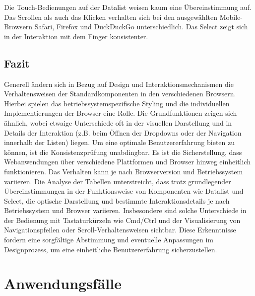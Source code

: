 Die Touch-Bedienungen auf der Datalist weisen kaum eine Übereinstimmung auf. 
Das Scrollen als auch das Klicken verhalten sich bei den ausgewählten Mobile-Browsern Safari, Firefox und DuckDuckGo unterschiedlich.
Das Select zeigt sich in der Interaktion mit dem Finger konsistenter. 


\clearpage
\subsection{Fazit}
\label{sec:summeryExisting}

Generell ändern sich in Bezug auf Design und Interaktionsmechanismen die Verhaltensweisen der Standardkomponenten in den verschiedenen Browsern. 
Hierbei spielen das betriebssystemspezifische Styling und die individuellen Implementierungen der Browser eine Rolle. 
Die Grundfunktionen zeigen sich ähnlich, wobei etwaige Unterschiede oft in der visuellen Darstellung und in Details der Interaktion (z.B. beim Öffnen der Dropdowns oder der Navigation innerhalb der Listen) liegen. 
Um eine optimale Benutzererfahrung bieten zu können, ist die Konsistenzprüfung unabdingbar.
Es ist die Sicherstellung, dass Webanwendungen über verschiedene Plattformen und Browser hinweg einheitlich funktionieren. 
Das Verhalten kann je nach Browserversion und Betriebssystem variieren. 
Die Analyse der Tabellen unterstreicht, dass trotz grundlegender Übereinstimmungen in der Funktionsweise von Komponenten wie Datalist und Select, 
die optische Darstellung und bestimmte Interaktionsdetails je nach Betriebssystem und Browser variieren. 
Insbesondere sind solche Unterschiede in der Bedienung mit Tastaturkürzeln wie Cmd/Ctrl und der Visualisierung von Navigationspfeilen oder Scroll-Verhaltensweisen sichtbar. 
Diese Erkenntnisse fordern eine sorgfältige Abstimmung und eventuelle Anpassungen im Designprozess, um eine einheitliche Benutzererfahrung sicherzustellen.


\section{Anwendungsfälle}
\label{sec:useCases}

